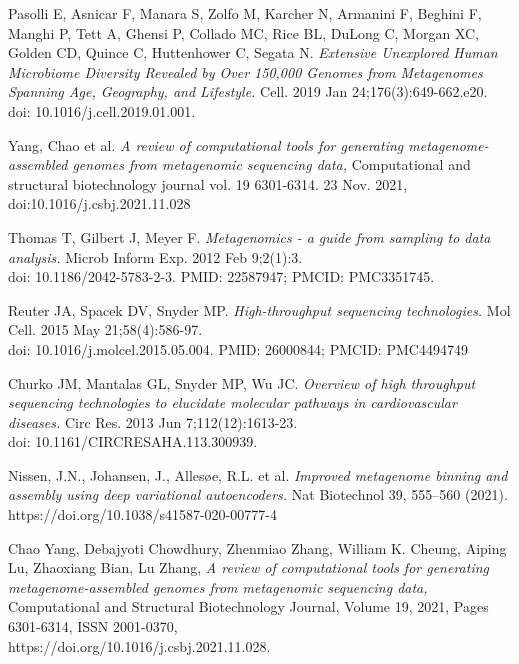 \documentclass[a4paper,titlepage, oneside]{book}
\begin{document}
\begin{thebibliography}{}

Pasolli E, Asnicar F, Manara S, Zolfo M, Karcher N, Armanini F, Beghini F, Manghi P, Tett A, Ghensi P, Collado MC, Rice BL, DuLong C, Morgan XC, Golden CD, Quince C, Huttenhower C, Segata N. \emph{Extensive Unexplored Human Microbiome Diversity Revealed by Over 150,000 Genomes from Metagenomes Spanning Age, Geography, and Lifestyle.} Cell. 2019 Jan 24;176(3):649-662.e20. \\doi: 10.1016/j.cell.2019.01.001.

Yang, Chao et al. \emph{A review of computational tools for generating metagenome-assembled genomes from metagenomic sequencing data,} Computational and structural biotechnology journal vol. 19 6301-6314. 23 Nov. 2021, \\doi:10.1016/j.csbj.2021.11.028

Thomas T, Gilbert J, Meyer F.
\emph{Metagenomics - a guide from sampling to data analysis.} Microb Inform Exp. 2012 Feb 9;2(1):3. \\doi: 10.1186/2042-5783-2-3. PMID: 22587947; PMCID: PMC3351745.


Reuter JA, Spacek DV, Snyder MP. \emph{High-throughput sequencing technologies.} Mol Cell. 2015 May 21;58(4):586-97.\\ doi: 10.1016/j.molcel.2015.05.004. PMID: 26000844; PMCID: PMC4494749


Churko JM, Mantalas GL, Snyder MP, Wu JC. \emph{Overview of high throughput sequencing technologies to elucidate molecular pathways in cardiovascular diseases.} Circ Res. 2013 Jun 7;112(12):1613-23. \\ doi: 10.1161/CIRCRESAHA.113.300939.

Nissen, J.N., Johansen, J., Allesøe, R.L. et al. \emph{Improved metagenome binning and assembly using deep variational autoencoders.} Nat Biotechnol 39, 555–560 (2021).\\https://doi.org/10.1038/s41587-020-00777-4


Chao Yang, Debajyoti Chowdhury, Zhenmiao Zhang, William K. Cheung, Aiping Lu, Zhaoxiang Bian, Lu Zhang,
\emph{A review of computational tools for generating metagenome-assembled genomes from metagenomic sequencing data,} Computational and Structural Biotechnology Journal, Volume 19, 2021, Pages 6301-6314, ISSN 2001-0370, \\https://doi.org/10.1016/j.csbj.2021.11.028.



\end{thebibliography}
\end{document}
